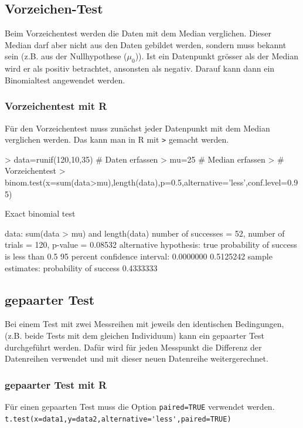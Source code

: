 \subsection{Vorzeichen-Test}
Beim Vorzeichentest werden die Daten mit dem Median verglichen. Dieser Median 
darf aber nicht aus den Daten gebildet werden, sondern muss bekannt sein 
(z.B. aus der Nullhypothese ($\mu_0$)). Ist ein Datenpunkt grösser als der 
Median wird er als positiv betrachtet, ansonsten als negativ. Darauf kann dann 
ein Binomialtest angewendet werden. 
\subsubsection{Vorzeichentest mit R}
Für den Vorzeichentest muss zunächst jeder Datenpunkt mit dem Median verglichen 
werden. Das kann man in R mit \verb!>! gemacht werden. \\
\begin{Schunk}
\begin{Sinput}
> data=runif(120,10,35)               # Daten erfassen
> mu=25                               # Median erfassen
> # Vorzeichentest
> binom.test(x=sum(data>mu),length(data),p=0.5,alternative='less',conf.level=0.95)
\end{Sinput}
\begin{Soutput}
	Exact binomial test

data:  sum(data > mu) and length(data) 
number of successes = 52, number of trials = 120, p-value = 0.08532
alternative hypothesis: true probability of success is less than 0.5 
95 percent confidence interval:
 0.0000000 0.5125242 
sample estimates:
probability of success 
             0.4333333 
\end{Soutput}
\end{Schunk}

\subsection{gepaarter Test}
Bei einem Test mit zwei Messreihen mit jeweils den identischen Bedingungen, 
(z.B. beide Tests mit dem gleichen Individuum) kann ein gepaarter Test 
durchgeführt werden. Dafür wird für jeden Messpunkt die Differenz der 
Datenreihen verwendet und mit dieser neuen Datenreihe weitergerechnet. 

\subsubsection{gepaarter Test mit R}
Für einen gepaarten Test muss die Option \verb!paired=TRUE! verwendet werden. \\
\verb!t.test(x=data1,y=data2,alternative='less',paired=TRUE)!

